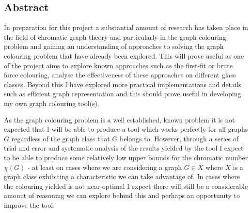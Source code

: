 \documentclass[12pt, a4paper]{article}
\begin{document}
\subsection*{Abstract}
\hspace{\parindent}In preparation for this project a substantial amount of research has taken place in the field of chromatic graph theory and particularly in the graph colouring problem and gaining an understanding of approaches to solving the graph colouring problem that have already been explored. This will prove useful as one of the project aims to explore known approaches such as the first-fit or brute force colouring, analyse the effectiveness of these approaches on different glass classes. Beyond this I have explored more practical implementations and details such as efficient graph representation and this should prove useful in developing my own graph colouring tool(s). \par
As the graph colouring problem is a well established, known problem it is not expected that I will be able to produce a tool which works perfectly for all graphs $G$ regardless of the graph class that $G$ belongs to. However, through a series of trial and error and systematic analysis of the results yielded by the tool I expect to be able to produce some relatively low upper bounds for the chromatic number $\chi(G)$ - at least on cases where we are considering a graph $G \in X$ where $X$ is a graph class exhibiting a characteristic we can take advantage of. In cases where the colouring yielded is not near-optimal I expect there will still be a considerable amount of reasoning we can explore behind this and perhaps an opportunity to improve the tool.
\end{document}
